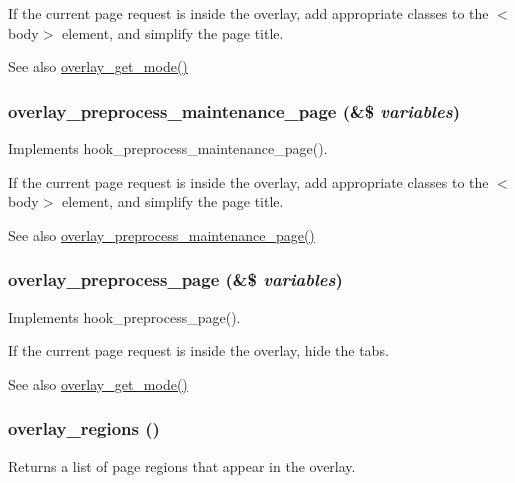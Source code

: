 If the current page request is inside the overlay, add appropriate classes to the $<$body$>$ element, and simplify the page title.

\begin{DoxySeeAlso}{See also}
\hyperlink{overlay_8module_a3d783a955948f187d6777f7671531621}{overlay\_\-get\_\-mode()} 
\end{DoxySeeAlso}
\hypertarget{overlay_8module_a32721f70b2f31af42ebf8ffb875f5963}{
\subsubsection[{overlay\_\-preprocess\_\-maintenance\_\-page}]{\setlength{\rightskip}{0pt plus 5cm}overlay\_\-preprocess\_\-maintenance\_\-page (\&\$ {\em variables})}}
\label{overlay_8module_a32721f70b2f31af42ebf8ffb875f5963}
Implements hook\_\-preprocess\_\-maintenance\_\-page().

If the current page request is inside the overlay, add appropriate classes to the $<$body$>$ element, and simplify the page title.

\begin{DoxySeeAlso}{See also}
\hyperlink{overlay_8module_a32721f70b2f31af42ebf8ffb875f5963}{overlay\_\-preprocess\_\-maintenance\_\-page()} 
\end{DoxySeeAlso}
\hypertarget{overlay_8module_a7a891bb3f936f2e18d958f31dbed275c}{
\subsubsection[{overlay\_\-preprocess\_\-page}]{\setlength{\rightskip}{0pt plus 5cm}overlay\_\-preprocess\_\-page (\&\$ {\em variables})}}
\label{overlay_8module_a7a891bb3f936f2e18d958f31dbed275c}
Implements hook\_\-preprocess\_\-page().

If the current page request is inside the overlay, hide the tabs.

\begin{DoxySeeAlso}{See also}
\hyperlink{overlay_8module_a3d783a955948f187d6777f7671531621}{overlay\_\-get\_\-mode()} 
\end{DoxySeeAlso}
\hypertarget{overlay_8module_abc2ab232b7d87656670589aacbf8f97c}{
\subsubsection[{overlay\_\-regions}]{\setlength{\rightskip}{0pt plus 5cm}overlay\_\-regions ()}}
\label{overlay_8module_abc2ab232b7d87656670589aacbf8f97c}
Returns a list of page regions that appear in the overlay.

